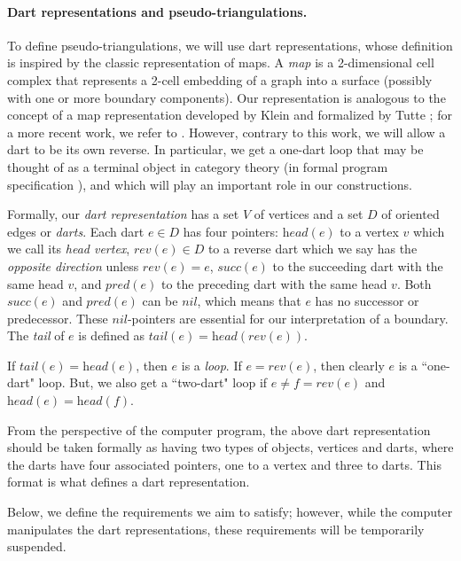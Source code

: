 \documentclass[10pt,a4paper]{article}
\def\nil{\textit{nil}}
\def\head{\textit{head}}
\def\tail{\textit{tail}}
\def\reverse{\textit{rev}}
\def\successor{\textit{succ}}
\def\predecessor{\textit{pred}}
\begin{document}
\paragraph{Dart representations and pseudo-triangulations.}
To define pseudo-triangulations, we will use dart representations, whose definition is inspired by the classic
representation of maps.
A \emph{map} is a 2-dimensional cell complex that represents a 2-cell embedding of a graph into a surface (possibly with one or more boundary components). Our representation is analogous to the concept of a map representation developed by Klein \cite{Klein1879} and formalized by Tutte \cite{Tutte1971}; for a more recent work, we refer to \cite{KMNZ1,KMNZ2}.
However, contrary to this work, we will allow a dart to be its own reverse. In particular, we get a one-dart loop that may be thought of as a terminal object in category theory (in formal program specification \cite{BarrWels95}), and which will play an important role in our constructions.


Formally, our \emph{dart representation} has a set $V$ of vertices and a set $D$ of oriented edges or \emph{darts}. Each dart $e\in D$ has
four pointers: $\head(e)$ to a vertex $v$ which we call its \emph{head vertex}, $\reverse(e)\in D$ to a reverse dart which we say has the \emph{opposite direction} unless $\reverse(e)=e$, $\successor(e)$ 
to the succeeding dart with the same head $v$, 
and $\predecessor(e)$ to the preceding dart with the same head $v$. 
Both $\successor(e)$ and $\predecessor(e)$ can be $\nil$, which means that $e$ has no successor or predecessor.
These $\nil$-pointers are essential for our interpretation of a boundary.
The \emph{tail} of $e$ is defined as $\tail(e)=\head(\reverse(e))$. 

If $\tail(e)=\head(e)$, then $e$ is a \emph{loop}. If $e=\reverse(e)$, then clearly $e$ is a ``one-dart" loop. But, we also get a ``two-dart" loop if 
$e \neq f=\reverse(e)$ and $\head(e)=\head(f)$. 


From the perspective of the
computer program, the above dart representation should be taken formally as having
two types of objects, vertices and darts, where the darts
have four associated pointers, one to a vertex and three to darts. This format is what defines a dart representation.

Below, we define the requirements we aim to satisfy; however, while the computer manipulates the dart representations, these requirements will be temporarily suspended.
\end{document}
